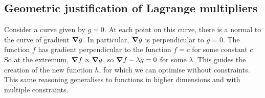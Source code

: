 \subsection{Geometric justification of Lagrange multipliers}
Consider a curve given by \(g = 0\).
At each point on this curve, there is a normal to the curve of gradient \(\grad{g}\).
In particular, \(\grad{g}\) is perpendicular to \(g = 0\).
The function \(f\) has gradient perpendicular to the function \(f = c\) for some constant \(c\).
So at the extremum, \(\grad{f} \propto \grad{g}\), so \(\grad{f - \lambda g} = 0\) for some \(\lambda\).
This guides the creation of the new function \(h\), for which we can optimise without constraints.
This same reasoning generalises to functions in higher dimensions and with multiple constraints.
